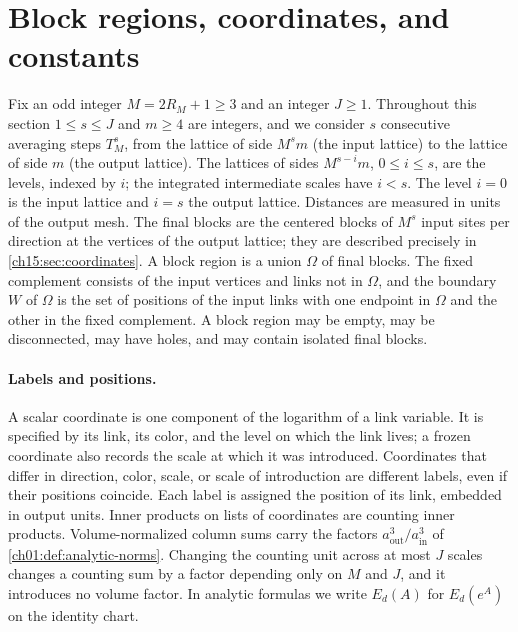 \section{Block regions, coordinates, and constants}\label{ch15:sec:setting}

Fix an odd integer $M=2R_M+1\ge3$ and an integer $J\ge1$. Throughout this section $1\le s\le J$ and $m\ge4$ are integers, and we consider $s$ consecutive averaging steps $T_M^s$, from the lattice of side $M^sm$ (the input lattice) to the lattice of side $m$ (the output lattice). The lattices of sides $M^{s-i}m$, $0\le i\le s$, are the levels, indexed by $i$; the integrated intermediate scales have $i<s$. The level $i=0$ is the input lattice and $i=s$ the output lattice. Distances are measured in units of the output mesh. The final blocks are the centered blocks of $M^s$ input sites per direction at the vertices of the output lattice; they are described precisely in \cref{ch15:sec:coordinates}. A block region is a union $\Omega$ of final blocks. The fixed complement consists of the input vertices and links not in $\Omega$, and the boundary $W$ of $\Omega$ is the set of positions of the input links with one endpoint in $\Omega$ and the other in the fixed complement. A block region may be empty, may be disconnected, may have holes, and may contain isolated final blocks.

\paragraph{Labels and positions.}
A scalar coordinate is one component of the logarithm of a link variable. It is specified by its link, its color, and the level on which the link lives; a frozen coordinate also records the scale at which it was introduced. Coordinates that differ in direction, color, scale, or scale of introduction are different labels, even if their positions coincide. Each label is assigned the position of its link, embedded in output units. Inner products on lists of coordinates are counting inner products. Volume-normalized column sums carry the factors $a_{\mathrm{out}}^3/a_{\mathrm{in}}^3$ of \cref{ch01:def:analytic-norms}. Changing the counting unit across at most $J$ scales changes a counting sum by a factor depending only on $M$ and $J$, and it introduces no volume factor. In analytic formulas we write $E_d(A)$ for $E_d(e^A)$ on the identity chart.

